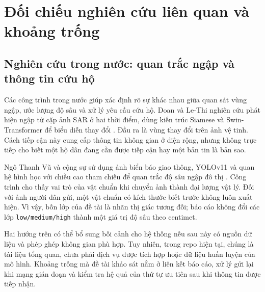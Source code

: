 \section{Đối chiếu nghiên cứu liên quan và khoảng trống}\label{sec:related-work}
\subsection{Nghiên cứu trong nước: quan trắc ngập và thông tin cứu hộ}
Các công trình trong nước giúp xác định rõ sự khác nhau giữa quan sát vùng ngập, ước lượng độ sâu và xử lý yêu cầu cứu hộ. Doan và Le-Thi nghiên cứu phát hiện ngập từ cặp ảnh SAR ở hai thời điểm, dùng kiến trúc Siamese và Swin-Transformer để biểu diễn thay đổi \citep{doan2025sar}. Đầu ra là vùng thay đổi trên ảnh vệ tinh. Cách tiếp cận này cung cấp thông tin không gian ở diện rộng, nhưng không trực tiếp cho biết một hộ dân đang cần được tiếp cận hay một bản tin là bản sao.

Ngô Thanh Vũ và cộng sự sử dụng ảnh biển báo giao thông, YOLOv11 và quan hệ hình học với chiều cao tham chiếu để quan trắc độ sâu ngập đô thị \citep{ngo2025urban}. Công trình cho thấy vai trò của vật chuẩn khi chuyển ảnh thành đại lượng vật lý. Đối với ảnh người dân gửi, một vật chuẩn có kích thước biết trước không luôn xuất hiện. Vì vậy, bốn lớp của đề tài là nhãn thị giác tương đối; báo cáo không đổi các lớp \texttt{low/medium/high} thành một giá trị độ sâu theo centimet.

Hai hướng trên có thể bổ sung bối cảnh cho hệ thống nếu sau này có nguồn dữ liệu và phép ghép không gian phù hợp. Tuy nhiên, trong repo hiện tại, chúng là tài liệu tổng quan, chưa phải dịch vụ được tích hợp hoặc dữ liệu huấn luyện của mô hình. Khoảng trống mà đề tài khảo sát nằm ở liên kết báo cáo, xử lý gửi lại khi mạng gián đoạn và kiểm tra hệ quả của thứ tự ưu tiên sau khi thông tin được tiếp nhận.

